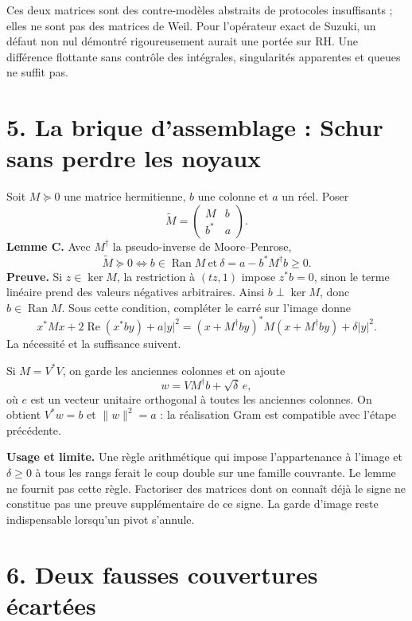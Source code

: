 \documentclass[
  11pt,
]{article}
\begin{document}
Ces deux matrices sont des contre-modèles abstraits de protocoles
insuffisants ; elles ne sont pas des matrices de Weil. Pour l'opérateur
exact de Suzuki, un défaut non nul démontré rigoureusement aurait une
portée sur RH. Une différence flottante sans contrôle des intégrales,
singularités apparentes et queues ne suffit pas.

\hypertarget{la-brique-dassemblage-schur-sans-perdre-les-noyaux}{%
\section{5. La brique d'assemblage : Schur sans perdre les
noyaux}\label{la-brique-dassemblage-schur-sans-perdre-les-noyaux}}

Soit \(M\succeq0\) une matrice hermitienne, \(b\) une colonne et \(a\)
un réel. Poser \[
\widetilde M=\begin{pmatrix}M&b\\b^*&a\end{pmatrix}.
\] \textbf{Lemme C.} Avec \(M^\dagger\) la pseudo-inverse de
Moore--Penrose, \[
\widetilde M\succeq0
\iff b\in\operatorname{Ran}M\ \text{et}\
\delta=a-b^*M^\dagger b\ge0.
\] \textbf{Preuve.} Si \(z\in\ker M\), la restriction à \((tz,1)\)
impose \(z^*b=0\), sinon le terme linéaire prend des valeurs négatives
arbitraires. Ainsi \(b\perp\ker M\), donc \(b\in\operatorname{Ran}M\).
Sous cette condition, compléter le carré sur l'image donne \[
x^*Mx+2\operatorname{Re}(x^*by)+a|y|^2
=(x+M^\dagger by)^*M(x+M^\dagger by)+\delta|y|^2.
\] La nécessité et la suffisance suivent.

Si \(M=V^*V\), on garde les anciennes colonnes et on ajoute \[
w=VM^\dagger b+\sqrt\delta\,e,
\] où \(e\) est un vecteur unitaire orthogonal à toutes les anciennes
colonnes. On obtient \(V^*w=b\) et \(\|w\|^2=a\) : la réalisation Gram
est compatible avec l'étape précédente.

\textbf{Usage et limite.} Une règle arithmétique qui impose
l'appartenance à l'image et \(\delta\ge0\) à tous les rangs ferait le
coup double sur une famille couvrante. Le lemme ne fournit pas cette
règle. Factoriser des matrices dont on connaît déjà le signe ne
constitue pas une preuve supplémentaire de ce signe. La garde d'image
reste indispensable lorsqu'un pivot s'annule.

\hypertarget{deux-fausses-couvertures-uxe9cartuxe9es}{%
\section{6. Deux fausses couvertures
écartées}\label{deux-fausses-couvertures-uxe9cartuxe9es}}
\end{document}
